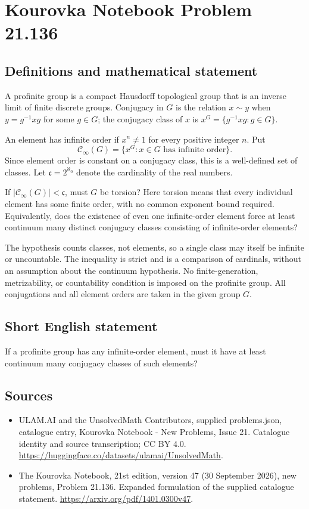 \documentclass[11pt,a4paper]{article}
\begin{document}
\section*{Kourovka Notebook Problem 21.136}\label{statement}

\subsection{Definitions and mathematical statement}
A profinite group is a compact Hausdorff topological group that is an inverse limit of finite discrete groups. Conjugacy in $G$ is the relation $x\sim y$ when $y=g^{-1}xg$ for some $g\in G$; the conjugacy class of $x$ is $x^G=\{g^{-1}xg:g\in G\}$.

An element has infinite order if $x^n\ne1$ for every positive integer $n$. Put
\[
 \mathcal C_\infty(G)=\{x^G:x\in G\text{ has infinite order}\}.
\]
Since element order is constant on a conjugacy class, this is a well-defined set of classes. Let $\mathfrak c=2^{\aleph_0}$ denote the cardinality of the real numbers.

If $|\mathcal C_\infty(G)|<\mathfrak c$, must $G$ be torsion? Here torsion means that every individual element has some finite order, with no common exponent bound required. Equivalently, does the existence of even one infinite-order element force at least continuum many distinct conjugacy classes consisting of infinite-order elements?

The hypothesis counts classes, not elements, so a single class may itself be infinite or uncountable. The inequality is strict and is a comparison of cardinals, without an assumption about the continuum hypothesis. No finite-generation, metrizability, or countability condition is imposed on the profinite group. All conjugations and all element orders are taken in the given group $G$.
\subsection{Short English statement}
If a profinite group has any infinite-order element, must it have at least continuum many conjugacy classes of such elements?
\subsection{Sources}
\begin{itemize}
\item[S1] ULAM.AI and the UnsolvedMath Contributors, supplied problems.json, catalogue entry, Kourovka Notebook - New Problems, Issue 21. Catalogue identity and source transcription; CC BY 4.0.
\url{https://huggingface.co/datasets/ulamai/UnsolvedMath}.
\item[S2] The Kourovka Notebook, 21st edition, version 47 (30 September 2026), new problems, Problem 21.136. Expanded formulation of the supplied catalogue statement.
\url{https://arxiv.org/pdf/1401.0300v47}.
\end{itemize}
\end{document}
